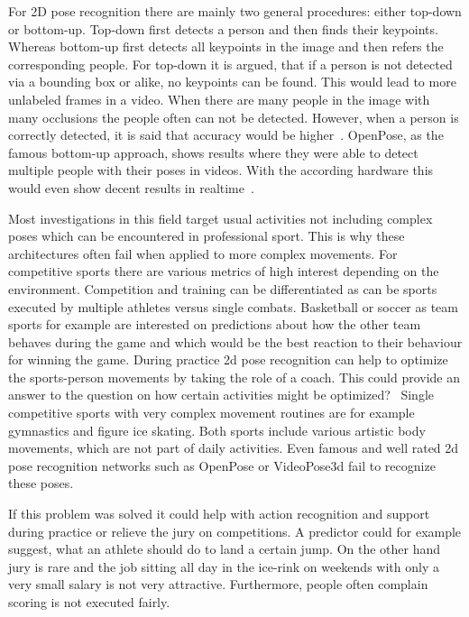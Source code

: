 \begin{flushleft}
For 2D pose recognition there are mainly two general procedures: either top-down or bottom-up.
Top-down first detects a person and then finds their keypoints.
Whereas bottom-up first detects all keypoints in the image and then refers the corresponding people.
For top-down it is argued, that if a person is not detected via a bounding box or alike, no keypoints can be found.
This would lead to more unlabeled frames in a video.
When there are many people in the image with many occlusions the people often can not be detected.
However, when a person is correctly detected, it is said that accuracy would be higher~\cite{synergetic}.
OpenPose, as the famous bottom-up approach, shows results where they were able to detect multiple people with their poses in videos.
With the according hardware this would even show decent results in realtime~\cite{openpose}.
\end{flushleft}
\begin{flushleft}
Most investigations in this field target usual activities not including complex poses which can be encountered in professional sport.
This is why these architectures often fail when applied to more complex movements.
For competitive sports there are various metrics of high interest depending on the environment.
Competition and training can be differentiated as can be sports executed by multiple athletes versus single combats.
Basketball or soccer as team sports for example are interested on predictions about
how the other team behaves during the game and which would be the best reaction to their behaviour for winning the game.
During practice 2d pose recognition can help to optimize the sports-person movements by taking the role of a coach.
This could provide an answer to the question on how certain activities might be optimized? \
Single competitive sports with very complex movement routines are for example gymnastics and figure ice skating.
Both sports include various artistic body movements, which are not part of daily activities.
Even famous and well rated 2d pose recognition networks such as OpenPose or VideoPose3d fail to recognize these poses.
\end{flushleft}
\begin{flushleft}
If this problem was solved it could help with action recognition and support during practice or relieve the jury on competitions.
A predictor could for example suggest, what an athlete should do to land a certain jump.
On the other hand jury is rare and the job sitting all day in the ice-rink on weekends with only a very small salary is not very attractive.
Furthermore, people often complain scoring is not executed fairly.
\end{flushleft}
